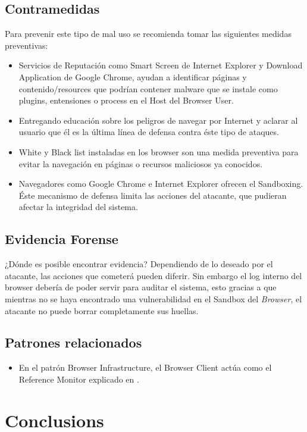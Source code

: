 \documentclass{sig-alternate-05-2015}
\begin{document}
\subsection{Contramedidas} 
  Para prevenir este tipo de mal uso se recomienda tomar las siguientes medidas preventivas:
  \begin{itemize}
    \item Servicios de Reputación como Smart Screen de Internet Explorer y Download Application de Google Chrome, ayudan a identificar páginas y contenido/resources que podrían contener malware que se instale como plugins, entensiones o process en el Host del Browser User.
    \item Entregando educación sobre los peligros de navegar por Internet y aclarar al usuario que él es la última línea de defensa contra éste tipo de ataques.
    \item White y Black list instaladas en los browser son una medida preventiva para evitar la navegación en páginas o recursos maliciosos ya conocidos.
    \item Navegadores como Google Chrome e Internet Explorer ofrecen el Sandboxing. Éste mecanismo de defensa limita las acciones del atacante, que pudieran afectar la integridad del sistema.
  \end{itemize}

\subsection{Evidencia Forense}
  ¿Dónde es posible encontrar evidencia?
  Dependiendo de lo deseado por el atacante, las acciones que cometerá pueden diferir. Sin embargo el log interno del browser debería de poder servir para auditar el sistema, esto gracias a que mientras no se haya encontrado una vulnerabilidad en el Sandbox del \textit{Browser}, el atacante no puede borrar completamente sus huellas.

\subsection{Patrones relacionados}
  \begin{itemize}
    \item En el patrón Browser Infrastructure, el Browser Client actúa como el Reference Monitor explicado en \cite{fernandez2001pattern}.
  \end{itemize}


\section*{Conclusions}
\end{document}
